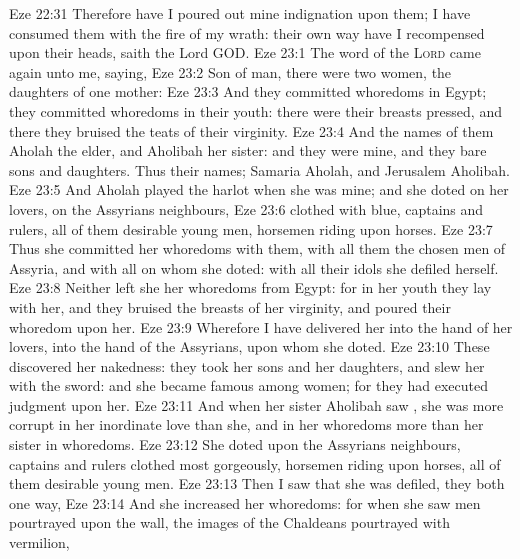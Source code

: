 \vs Eze 22:31 Therefore have I poured out mine indignation upon them; I have consumed them with the fire of my wrath: their own way have I recompensed upon their heads, saith the Lord GOD.
\vs Eze 23:1 The word of the \textsc{Lord} came again unto me, saying,
\vs Eze 23:2 Son of man, there were two women, the daughters of one mother:
\vs Eze 23:3 And they committed whoredoms in Egypt; they committed whoredoms in their youth: there were their breasts pressed, and there they bruised the teats of their virginity.
\vs Eze 23:4 And the names of them  Aholah the elder, and Aholibah her sister: and they were mine, and they bare sons and daughters. Thus  their names; Samaria  Aholah, and Jerusalem Aholibah.
\vs Eze 23:5 And Aholah played the harlot when she was mine; and she doted on her lovers, on the Assyrians  neighbours,
\vs Eze 23:6  clothed with blue, captains and rulers, all of them desirable young men, horsemen riding upon horses.
\vs Eze 23:7 Thus she committed her whoredoms with them, with all them  the chosen men of Assyria, and with all on whom she doted: with all their idols she defiled herself.
\vs Eze 23:8 Neither left she her whoredoms  from Egypt: for in her youth they lay with her, and they bruised the breasts of her virginity, and poured their whoredom upon her.
\vs Eze 23:9 Wherefore I have delivered her into the hand of her lovers, into the hand of the Assyrians, upon whom she doted.
\vs Eze 23:10 These discovered her nakedness: they took her sons and her daughters, and slew her with the sword: and she became famous among women; for they had executed judgment upon her.
\vs Eze 23:11 And when her sister Aholibah saw , she was more corrupt in her inordinate love than she, and in her whoredoms more than her sister in  whoredoms.
\vs Eze 23:12 She doted upon the Assyrians  neighbours, captains and rulers clothed most gorgeously, horsemen riding upon horses, all of them desirable young men.
\vs Eze 23:13 Then I saw that she was defiled,  they  both one way,
\vs Eze 23:14 And  she increased her whoredoms: for when she saw men pourtrayed upon the wall, the images of the Chaldeans pourtrayed with vermilion,
